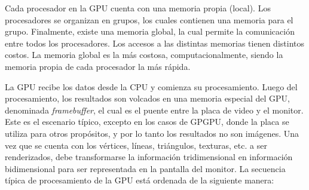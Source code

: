 Cada procesador en la GPU cuenta con una memoria propia (local).
Los procesadores se organizan en grupos, los cuales contienen una memoria para el grupo.
Finalmente, existe una memoria global, la cual permite la comunicación entre todos los procesadores.
Los accesos a las distintas memorias tienen distintos costos.
La memoria global es la más costosa, computacionalmente, siendo la memoria propia de cada procesador la más rápida.

La GPU recibe los datos desde la CPU y comienza su procesamiento.
Luego del procesamiento, los resultados son volcados en una memoria especial del GPU, denominada {\em framebuffer}, el cual es el puente entre la placa de video y el monitor.
Este es el escenario típico, excepto en los casos de GPGPU, donde la placa se utiliza para otros propósitos, y por lo tanto los resultados no son imágenes.
Una vez que se cuenta con los vértices, líneas, triángulos, texturas, etc. a ser renderizados, debe transformarse la información tridimensional en información bidimensional para ser representada en la pantalla del monitor.
La secuencia t\'ipica de procesamiento de la GPU est\'a ordenada de la siguiente manera:
